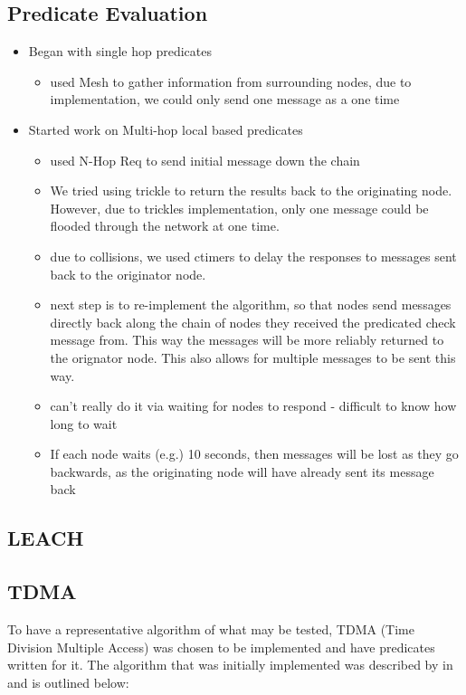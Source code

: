 \subsection{Predicate Evaluation}

\begin{itemize}
	\item[] Began with single hop predicates
	\begin{itemize}
		\item used Mesh to gather information from surrounding nodes, due to implementation, we could only send one message as a one time
	\end{itemize}	
	\item[] Started work on Multi-hop local based predicates
	\begin{itemize}
		\item used N-Hop Req to send initial message down the chain
		\item We tried using trickle to return the results back to the originating node. However, due to trickles implementation, only one message could be flooded through the network at one time. 
		\item due to collisions, we used ctimers to delay the responses to messages sent back to the originator node.
		\item next step is to re-implement the algorithm, so that nodes send messages directly back along the chain of nodes they received the predicated check message from. This way the messages will be more reliably returned to the orignator node. This also allows for multiple messages to be sent this way.
		\item can't really do it via waiting for nodes to respond - difficult to know how long to wait
		\item[] If each node waits (e.g.) 10 seconds, then messages will be lost as they go backwards, as the originating node will have already sent its message back
	\end{itemize}	
\end{itemize}


\subsection{LEACH}
\cite{LEACH}

\subsection{TDMA}

To have a representative algorithm of what may be tested, TDMA (Time Division Multiple Access) was chosen to be implemented and have predicates written for it. The algorithm that was initially implemented was described by \citeauthor{DCATechReport} in \cite[p.~4]{DCATechReport} and is outlined below:

